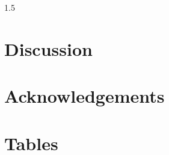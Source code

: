 \documentclass[11pt]{article}
\begin{document}
\begin{spacing}{1.5}
\section*{Discussion}


\section*{Acknowledgements}



\end{spacing}

\clearpage



\section*{Tables}
\end{document}
